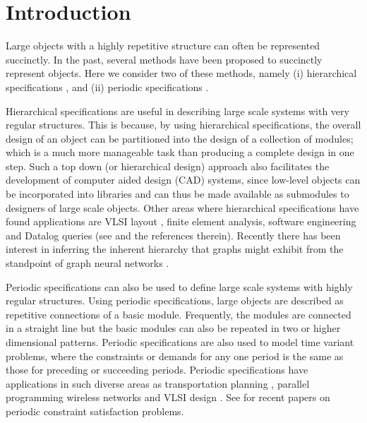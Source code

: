 \section{Introduction}
\label{sec:intro}

Large objects with a highly repetitive structure can often be represented
succinctly.
In the past, several methods have been proposed to succinctly 
represent objects.
Here we consider two of these methods, namely
(i) hierarchical specifications  
\cite{Ga82,GW83,LW92,BOW83,RH93},
and (ii) periodic specifications 
\cite{CM91,HW92,IS87,KO91,KS88,Or82a,Wa93}.
 


Hierarchical specifications are useful in describing large scale systems with
very regular structures. This is because, 
by using hierarchical specifications, the overall design of an object can be 
partitioned into the design of a collection of modules;
which is a 
much more manageable task than producing a complete design in one step.
Such a top down (or hierarchical design) approach 
also facilitates the development of computer aided design (CAD) systems, since
low-level objects can be  incorporated into libraries and can thus be made
available as submodules to designers of large scale  objects.
Other areas where hierarchical specifications have found applications are
VLSI layout \cite{HLW92,HW92,RH93},  
finite element analysis, software engineering and Datalog queries 
(see \cite{HLW92,Ma94,marathe1995complexity,bottcher2020simulation,goller2005fixpoint,brenguier2012comparison,lohrey2012model,tapken1999implementing} 
and the references therein).  Recently there has been interest in
inferring the inherent hierarchy that graphs might exhibit from the
standpoint of graph neural networks \cite{ying2018hierarchical}.

Periodic specifications
can also be used to define large scale systems with highly regular structures.
Using  periodic specifications, 
large objects are  described as repetitive connections of a basic module.
Frequently, the modules are connected in a straight line 
but the basic modules can also  be repeated in two or higher
dimensional patterns. Periodic specifications are also used to 
model time variant  problems,  where the constraints
or demands  for any one period is the same as those for preceding or 
succeeding periods. 
Periodic specifications 
have applications in such diverse areas  as  transportation planning
\cite{Or82a,HLW92,marathe1995complexity,drucker2019cyclic,ho2015cyclic},
parallel programming \cite{HLW92,KMW67} wireless networks \cite{andreou2002radiocoloring} and 
VLSI design \cite{IS87,IS88}. See \cite{chen2003periodic,chen2005periodic} for recent 
papers on periodic constraint satisfaction problems.

